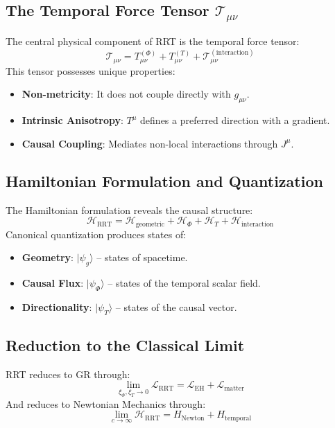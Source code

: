 \documentclass[12pt,a4paper]{article}
\begin{document}
\subsection{The Temporal Force Tensor \texorpdfstring{$\mathcal{T}_{\mu\nu}$}{T\_munu}}
The central physical component of RRT is the temporal force tensor:
\begin{equation}
    \mathcal{T}_{\mu\nu} = T^{(\Phi)}_{\mu\nu} + T^{(T)}_{\mu\nu} + \mathcal{T}^{(\text{interaction})}_{\mu\nu}
\end{equation}
This tensor possesses unique properties:
\begin{itemize}
    \item \textbf{Non-metricity}: It does not couple directly with $g_{\mu\nu}$.
    \item \textbf{Intrinsic Anisotropy}: $T^\mu$ defines a preferred direction with a gradient.
    \item \textbf{Causal Coupling}: Mediates non-local interactions through $J^\mu. $
\end{itemize}

\subsection{Hamiltonian Formulation and Quantization}
The Hamiltonian formulation reveals the causal structure:
\begin{equation}
    \mathcal{H}_{\text{RRT}} = \mathcal{H}_{\text{geometric}} + \mathcal{H}_\Phi + \mathcal{H}_T + \mathcal{H}_{\text{interaction}}
\end{equation}
Canonical quantization produces states of:
\begin{itemize}
    \item \textbf{Geometry}: $|\psi_g\rangle$ -- states of spacetime.
    \item \textbf{Causal Flux}: $|\psi_\Phi\rangle$ -- states of the temporal scalar field.
    \item \textbf{Directionality}: $|\psi_T\rangle$ -- states of the causal vector.
\end{itemize}

\subsection{Reduction to the Classical Limit}
RRT reduces to GR through:
\begin{equation}
    \lim_{\xi_\Phi, \xi_T \to 0} \mathcal{L}_{\text{RRT}} = \mathcal{L}_{\text{EH}} + \mathcal{L}_{\text{matter}}
\end{equation}
And reduces to Newtonian Mechanics through:
\begin{equation}
    \lim_{c \to \infty} \mathcal{H}_{\text{RRT}} = H_{\text{Newton}} + H_{\text{temporal}}
\end{equation}
\end{document}
